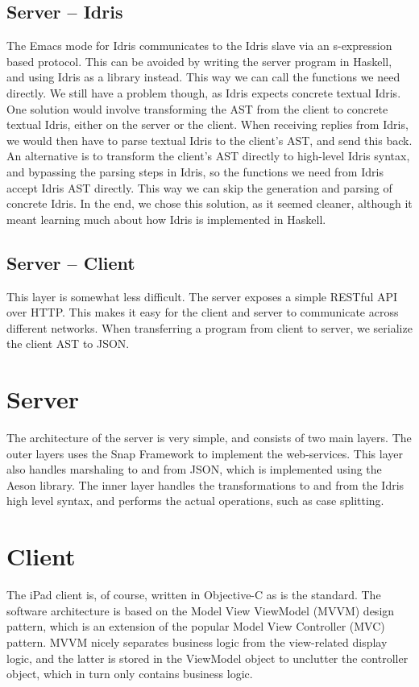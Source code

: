\subsection{Server -- Idris}
The Emacs mode for Idris communicates to the Idris slave via an s-expression
based protocol. This can be avoided by writing the server program in
Haskell, and using Idris as a library instead. This way we can call the
functions we need directly. We still have a problem though, as Idris expects
concrete textual Idris. One solution would involve transforming the AST from 
the client to concrete textual Idris, either on the server or the client. When
receiving replies from Idris, we would then have to parse textual Idris to the
client's AST\@, and send this back. An alternative is to transform the 
client's AST directly to high-level Idris syntax, and bypassing the parsing
steps in Idris, so the functions we need from Idris accept Idris AST directly.
This way we can skip the generation and parsing of concrete Idris. In the end,
we chose this solution, as it seemed cleaner, although it meant learning much
about how Idris is implemented in Haskell.

\subsection{Server -- Client}
This layer is somewhat less difficult. The server exposes a simple RESTful API 
over HTTP\@. This makes it easy for the client and server to communicate across
different networks. When transferring a program from client to server, we
serialize the client AST to JSON\@.

\section{Server}
The architecture of the server is very simple, and consists of two main 
layers. The outer layers uses the Snap Framework to implement the 
web-services. This layer also handles marshaling to and from JSON\@, which is 
implemented using the Aeson library. The inner layer handles the 
transformations to and from the Idris high level syntax, and performs the 
actual operations, such as case splitting.


\section{Client}
The iPad client is, of course, written in Objective-C as is the standard. The
software architecture is based on the Model View ViewModel (MVVM) design 
pattern, which is an extension of the popular Model View Controller 
(MVC) pattern. MVVM nicely separates business logic from the view-related
display logic, and the latter is stored in the ViewModel object to unclutter 
the controller object, which in turn only contains business logic.

